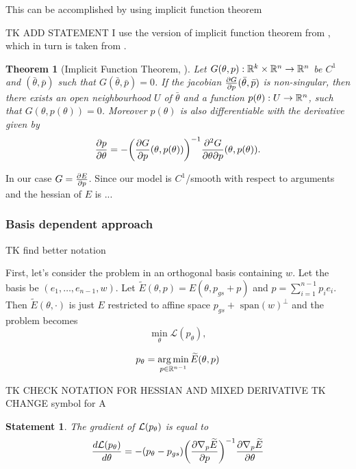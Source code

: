 \documentclass[a4paper,10pt]{report}
\newtheorem{theorem}{Theorem}
\newtheorem{statement}{Statement}
\begin{document}
This can be accomplished by using implicit function theorem

TK ADD STATEMENT
I use the version of implicit function theorem from \cite{zucchet2022beyond}, which in turn is taken from \cite{dontchev2009implicit}.
\begin{theorem}[Implicit Function Theorem, \cite{zucchet2022beyond} ]
Let $G(\theta, p): \mathbb{R}^k \times \mathbb{R}^n \to \mathbb{R}^n$ be $C^1$ and $(\bar{\theta}, \bar{p})$ such that $G(\bar{\theta},\bar{p})=0$. If the jacobian
$\frac{\partial G}{\partial p}(\bar{\theta},\bar{p})$ is non-singular, then there exists an open neighbourhood $U$ of $\bar{\theta} $ and a function $p(\theta):U \to \mathbb{R}^n$, such that $G(\theta, p(\theta)) = 0$. Moreover $p(\theta)$ is also differentiable with
the  derivative given by
\begin{equation}
\frac{\partial p}{\partial \theta}= - \bigg(\frac{\partial G}{\partial p}(\theta, p(\theta))\bigg)^{-1} \frac{\partial^2 G}{\partial \theta \partial p}(\theta, p(\theta)).
\end{equation}

\end{theorem}
In our case $G = \frac{\partial E}{\partial p}$. Since our model is $C^1$/smooth with respect to  arguments and the hessian of $E$ is ...

\subsubsection{Basis dependent approach}
TK find better notation

First, let's consider the problem in an orthogonal basis containing $w$.
Let the basis be $(e_1,\ldots, e_{n-1}, w)$.
Let $\widetilde{E}(\theta, p) = E(\theta, p_{gs}+ p)$ and $p = \sum_{i=1}^{n-1} p_i e_i$.
Then $\widetilde E(\theta, \cdot)$ is just $E$ restricted to affine space $p_{gs}+\text{ span} (w)^\perp$
and the problem becomes
\begin{equation}
  \min_\theta \mathcal{L}(p_\theta),
\end{equation}


\begin{equation}
 p_\theta = \operatorname*{arg\,min}_{p\in \mathbb{R}^{n-1}} \widetilde{E}(\theta, p)
\end{equation}


TK CHECK NOTATION FOR HESSIAN AND MIXED DERIVATIVE
TK CHANGE symbol for A
\begin{statement}
The gradient of $\mathcal{L}(p_\theta)$ is equal to
 \begin{equation}
 \frac{d\mathcal{L}(p_\theta)}{d \theta} = -(p_\theta - p_{gs}) \bigg(\frac{\partial \nabla_p \widetilde{E}}{\partial p}\bigg)^{-1}  \frac{\partial  \nabla_p \widetilde{E}}{\partial \theta}
\end{equation}
\end{statement}
\end{document}
